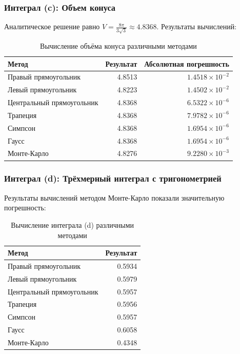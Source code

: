 \documentclass[a4paper]{article}
\begin{document}
\subsubsection*{Интеграл (c): Объем конуса}

Аналитическое решение равно $V = \frac{8\pi}{3\sqrt{3}} \approx 4.8368$. Результаты вычислений:

\begin{table}[H]
\centering
\small
\begin{tabular}{lrr}
\hline
Метод & Результат & Абсолютная погрешность \\
\hline
Правый прямоугольник & 4.8513 & $1.4518 \times 10^{-2}$ \\
Левый прямоугольник & 4.8223 & $1.4502 \times 10^{-2}$ \\
Центральный прямоугольник & 4.8368 & $6.5322 \times 10^{-6}$ \\
Трапеция & 4.8368 & $7.9782 \times 10^{-6}$ \\
Симпсон & 4.8368 & $1.6954 \times 10^{-6}$ \\
Гаусс & 4.8368 & $1.6954 \times 10^{-6}$ \\
Монте-Карло & 4.8276 & $9.2280 \times 10^{-3}$ \\
\hline
\end{tabular}
\caption{Вычисление объёма конуса различными методами}
\label{tab:cone}
\end{table}

\subsubsection*{Интеграл (d): Трёхмерный интеграл с тригонометрией}

Результаты вычислений методом Монте-Карло показали значительную погрешность:

\begin{table}[H]
\centering
\small
\begin{tabular}{lr}
\hline
Метод & Результат \\
\hline
Правый прямоугольник & 0.5934 \\
Левый прямоугольник & 0.5979 \\
Центральный прямоугольник & 0.5957 \\
Трапеция & 0.5956 \\
Симпсон & 0.5957 \\
Гаусс & 0.6058 \\
Монте-Карло & 0.4348 \\
\hline
\end{tabular}
\caption{Вычисление интеграла (d) различными методами}
\label{tab:int_d}
\end{table}
\end{document}
